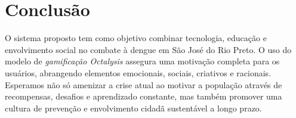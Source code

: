 \documentclass[a5paper, 12pt]{article}
\begin{document}
\section{Conclusão}
O sistema proposto tem como objetivo combinar tecnologia, educação e envolvimento social no combate à dengue em São José do Rio Preto. O uso do modelo de \textit{gamificação Octalysis} assegura uma motivação completa para os usuários, abrangendo elementos emocionais, sociais, criativos e racionais. Esperamos não só amenizar a crise atual ao motivar a população através de recompensas, desafios e aprendizado constante, mas também promover uma cultura de prevenção e envolvimento cidadã sustentável a longo prazo.
\end{document}
